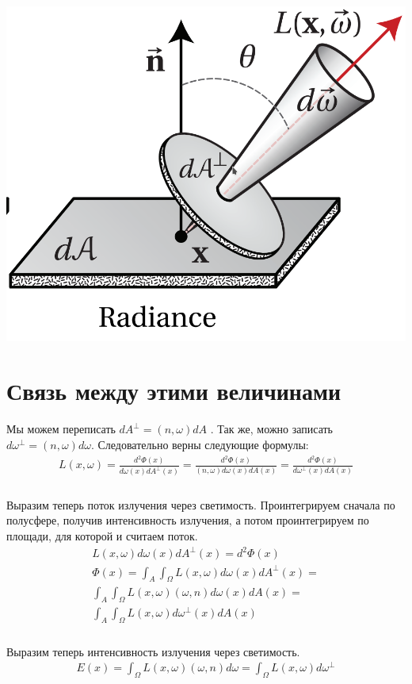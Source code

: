 \documentclass[titlepage]{article}
\begin{document}
\begin{center}
	\includegraphics[scale=0.5]{Radiance.png}
\end{center}

\section{Связь между этими величинами}
Мы можем переписать $dA^{\perp} = (n, \omega)dA$ . Так же, можно записать $d\omega^{\perp} = (n, \omega)d\omega$. Следовательно верны следующие формулы:
\begin{gather}
	L(x, \omega) = \frac{d^2\Phi(x)}{d\omega(x)dA^{\perp}(x)} = \frac{d^2\Phi(x)}{(n,\omega)d\omega(x)dA(x)} = \frac{d^2\Phi(x)}{d\omega^{\perp}(x)dA(x)}
\end{gather}
\subparagraph{} Выразим теперь поток излучения через светимость. Проинтегрируем сначала по полусфере, получив интенсивность излучения, а потом проинтегрируем по площади, для которой и считаем поток.
\begin{gather}
	L(x,\omega)d\omega(x)dA^{\perp}(x) = d^2\Phi(x)\\
	\Phi(x) = \int_A \int_{\Omega} L(x, \omega)d\omega(x)dA^{\perp}(x) = \\ \int_A \int_{\Omega} L(x, \omega)(\omega, n)d\omega(x)dA(x) = \\ \int_A \int_{\Omega} L(x, \omega)d\omega^{\perp}(x)dA(x)
\end{gather}
\subparagraph{} Выразим теперь интенсивность излучения через светимость. 
\begin{gather}
	E(x) = \int_{\Omega}L(x,\omega)(\omega, n)d\omega = \int_{\Omega}L(x, \omega)d\omega^{\perp}
\end{gather}
\end{document}
